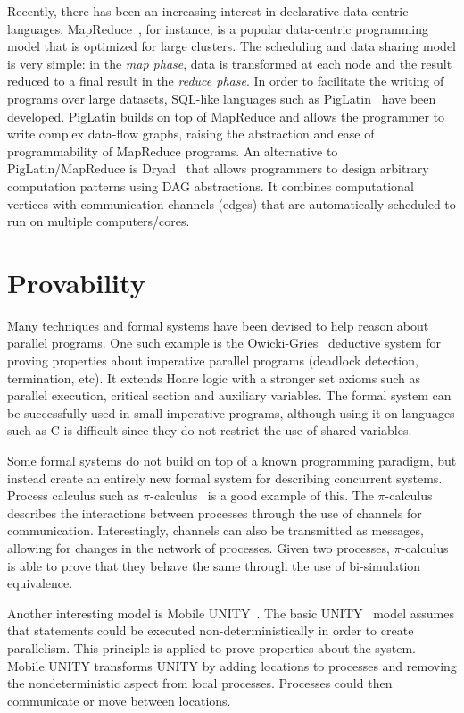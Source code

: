 Recently, there has been an increasing interest in declarative data-centric
languages. MapReduce~\cite{Dean:2008:MSD:1327452.1327492}, for instance, is a
popular data-centric programming model that is optimized for large clusters. The
scheduling and data sharing model is very simple: in the \emph{map phase}, data
is transformed at each node and the result reduced to a final result in the
\emph{reduce phase}. In order to facilitate the writing of programs over large
datasets, SQL-like languages such as
PigLatin~\cite{Olston:2008:PLN:1376616.1376726} have been developed. PigLatin
builds on top of MapReduce and allows the programmer to write complex data-flow
graphs, raising the abstraction and ease of programmability of MapReduce
programs. An alternative to PigLatin/MapReduce is
Dryad~\cite{Isard:2007:DDD:1272996.1273005} that allows programmers to design
arbitrary computation patterns using DAG abstractions. It combines computational
vertices with communication channels (edges) that are automatically scheduled to
run on multiple computers/cores.

\section{Provability}

Many techniques and formal systems have been devised to help reason about
parallel programs.  One such example is the
Owicki-Gries~\cite{Owicki:1976:VPP:360051.360224} deductive system for proving
properties about imperative parallel programs (deadlock detection, termination,
etc). It extends Hoare logic with a stronger set axioms such as parallel
execution, critical section and auxiliary variables. The formal system can be
successfully used in small imperative programs, although using it on languages
such as C is difficult since they do not restrict the use of shared variables.

Some formal systems do not build on top of a known programming paradigm, but
instead create an entirely new formal system for describing concurrent systems.
Process calculus such as $\pi$-calculus~\cite{Milner:1999:CMS:329902} is a good
example of this.  The $\pi$-calculus describes the interactions between
processes through the use of channels for communication. Interestingly, channels
can also be transmitted as messages, allowing for changes in the network of
processes.  Given two processes, $\pi$-calculus is able to prove that they
behave the same through the use of bi-simulation equivalence.

Another interesting model is Mobile UNITY~\cite{Roman97anintroduction}. The
basic UNITY~\cite{UNITY} model assumes that statements could be executed
non-deterministically in order to create parallelism. This principle is applied
to prove properties about the system.  Mobile UNITY transforms UNITY by adding
locations to processes and removing the nondeterministic aspect from local
processes. Processes could then communicate or move between locations.

